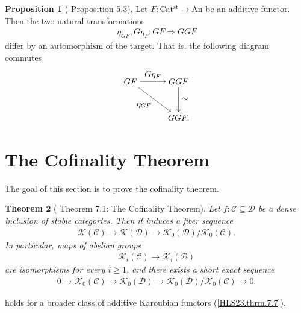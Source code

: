 \documentclass[a4paper,dvipdfmx,11pt,reqno]{amsart}
\newcommand{\C}{\mathcal{C}}
\newcommand{\D}{\mathcal{D}}
\newcommand{\K}{\mathcal{K}}
\newcommand{\An}{\mathrm{An}}
\newcommand{\Catst}{\mathrm{Cat^{st}}}
\newtheorem{theorem}{Theorem}[section]
\theoremstyle{definition}
\newtheorem{proposition}[theorem]{Proposition}
\begin{document}
\begin{proposition}[\cite{HLS23} Proposition 5.3] \label{HLS23.prop.5.3}
  Let $F : \Catst \to \An$ be an additive functor.
  Then the two natural transformations
  \begin{align*}
    \eta_{GF} , G\eta_{F} : GF \Rightarrow GGF
  \end{align*}
  differ by an automorphism of the target.
  That is, the following diagram commutes
  \[\begin{tikzpicture}[auto,->] 
    \node (tl) at (0,1.5) {$GF$}; 
    \node (tr) at (2,1.5) {$GGF$};
    \node (br) at (2,0) {$GGF.$}; 
    \draw (tl) -- node {$G\eta_{F}$} (tr); 
    \draw (tr) -- node {$\simeq$} (br); 
    \draw (tl) -- node[swap] {$\eta_{GF}$} (br);
  \end{tikzpicture}\] 
\end{proposition}


\section{The Cofinality Theorem}

The goal of this section is to prove the cofinality theorem.

\begin{theorem}[\cite{HLS23} Theorem 7.1: The Cofinality Theorem] \label{thrm.cofinality_theorem}
  Let $f : \C \subseteq \D$ be a dense inclusion of stable categories.
  Then it induces a fiber sequence
  \begin{align*}
    \K(\C) \to \K(\D) \to \K_0(\D)/\K_0(\C).
  \end{align*}
  In particular, maps of abelian groups
  \begin{align*}
    \K_i(\C) \to \K_i(\D)
  \end{align*}
  are isomorphisms for every $i \geq 1$, and there exists a short exact sequence 
  \begin{align*}
    0 \to \K_0(\C) \to \K_0(\D) \to \K_0(\D)/\K_0(\C) \to 0.
  \end{align*}
\end{theorem}

 holds for a broader class of additive Karoubian functors (\cref{HLS23.thrm.7.7}).
\end{document}
